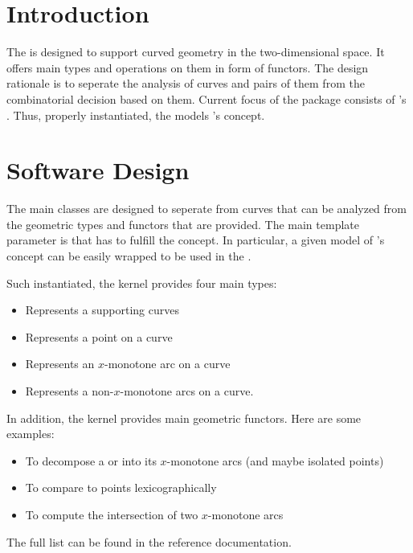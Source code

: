\section{Introduction}

The  is designed to support 
curved geometry in the two-dimensional space. It offers main types
and operations on them in form of functors. The design rationale is
to seperate the analysis of curves and pairs of them from the
combinatorial decision based on them. Current focus of the package
consists of \cgal's . Thus, 
properly instantiated, the 
models \cgal's  concept.

\section{Software Design}

The main classes are designed to seperate from curves that can be analyzed
from the geometric types and functors that are provided. The main
template parameter is  that has to fulfill the 
 concept. In particular, a given model of
\cgal's  concept can be easily
wrapped to be used in the .

Such instantiated, the kernel provides four main types:
\begin{itemize}
\item {} Represents a supporting curves
\item {} Represents a point on a curve
\item {} Represents an $x$-monotone arc on a curve
\item {} Represents a non-$x$-monotone arcs on a 
curve.
\end{itemize}

In addition, the kernel provides main geometric functors. Here are some
examples:
\begin{itemize}
\item {} To decompose a  or 
 into its $x$-monotone arcs (and maybe isolated
points)
\item {} To compare to points lexicographically
\item {} To compute the intersection of 
two $x$-monotone arcs
\end{itemize}
The full list can be found in the reference documentation.


